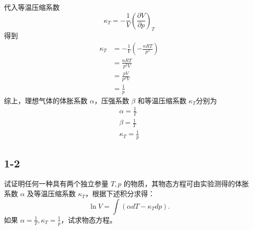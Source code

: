 代入等温压缩系数
\begin{equation}
    \kappa _T=-\frac{1}{V}\left( \frac{\partial V}{\partial p} \right) _T
\end{equation}
得到
\begin{equation}
    \begin{aligned}
        \kappa _T&=-\frac{1}{V}\left( -\frac{nRT}{p^2} \right) 
\\
&=\frac{nRT}{p^2V}
\\
&=\frac{pV}{p^2V}
\\
&=\frac{1}{p}
    \end{aligned}
\end{equation}
综上，理想气体的体胀系数 $\alpha$，压强系数 $\beta$ 和等温压缩系数 $\kappa_T$分别为
\begin{equation}
    \begin{aligned}
        \alpha =\frac{1}{T}
\\
\beta =\frac{1}{T}
\\
\kappa _T=\frac{1}{p}
    \end{aligned}
\end{equation}







\newpage
\subsection{1-2}
试证明任何一种具有两个独立参量 $T, p$ 的物质，其物态方程可由实验测得的体胀系数 $\alpha$ 及等温压缩系数 $\kappa_T$，根据下述积分求得：
$$\ln V = \int (\alpha dT - \kappa_T dp).$$
如果 $\alpha = \frac{1}{T}, \kappa_T = \frac{1}{p}$，试求物态方程。

